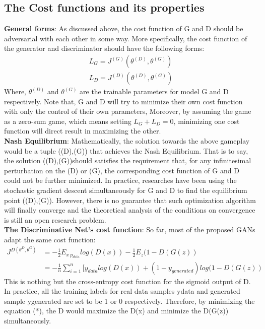 \documentclass[10pt,twocolumn,letterpaper]{article}
\begin{document}
\subsection{The Cost functions and its properties  }
\textbf{General forms}: As discussed above, the cost function of G and D should be adversarial with each other in some way. More specifically, the cost function of the generator and discriminator should have the following forms:
\begin{align}
L_G = J^{(G)}(\theta^{(D)},\theta^{(G)})\\
L_D = J^{(D)}(\theta^{(D)},\theta^{(G)})
\end{align}
Where, $\theta^{(D)}$ and $\theta^{(G)}$ are the trainable parameters for model G and D respectively. Note that, G and D will try to minimize their own cost function with only the control of their own parameters, Moreover, by assuming the game as a zero-sum game, which means setting $L_G+ L_D =  0$, minimizing one cost function will direct result in maximizing the other.\\

\textbf{Nash Equilibrium}:
Mathematically, the solution towards the above gameplay would be a tuple ((D),(G)) that achieves the Nash Equilibrium. That is to say, the solution ((D),(G))should satisfies the requirement that, for any infinitesimal perturbation on the (D) or  (G), the corresponding cost function of G and D could not be further minimized. In practice, researches have been using the stochastic gradient descent simultaneously for G and D to find the equilibrium point ((D),(G)). However, there is no guarantee that such optimization algorithm will finally converge and the theoretical analysis of the conditions on convergence is still an open research problem.\\
   	
\textbf{The Discriminative Net's cost function}:
So far, most of the proposed GANs adapt the same cost function:
\begin{align}
J^{D(\theta^{D},\theta^G)}&= -\frac{1}{2}E_{x~p_{data}}log(D(x)) -\frac{1}{2}E_z(1 - D(G(z))\\
		       &= -\frac{1}{n}\sum_{i=1}^{n}[y_{data}log(D(x)) + (1 -y_{generated})log(1 -D(G(z))   
\end{align}
This is nothing but the cross-entropy cost function for the sigmoid output of D. In practice, all the training labels for real data samples ydata and generated sample ygenerated are set to be 1 or 0 respectively. Therefore, by minimizing the equation (*), the D would maximize the D(x) and minimize the D(G(z)) simultaneously.\\
\end{document}
